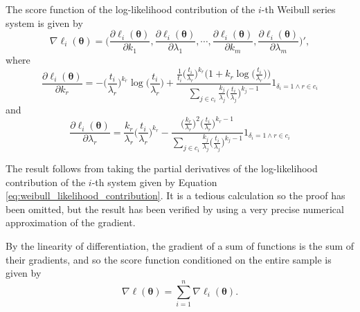 \documentclass[
]{article}
\begin{document}
\begin{theorem}
\label{thm:weibull_score}
The score function of the log-likelihood contribution of the $i$-th Weibull series
system is given by
\begin{equation}
\label{eq:weibull_score}
\nabla \ell_i(\boldsymbol{\theta}) = \biggl(
    \frac{\partial \ell_i(\boldsymbol{\theta})}{\partial k_1},
    \frac{\partial \ell_i(\boldsymbol{\theta})}{\partial \lambda_1},
    \cdots, 
    \frac{\partial \ell_i(\boldsymbol{\theta})}{\partial k_m},
    \frac{\partial \ell_i(\boldsymbol{\theta})}{\partial \lambda_m} \biggr)',
\end{equation}
where
\begin{equation}
\frac{\partial \ell_i(\boldsymbol{\theta})}{\partial k_r} = 
    -\biggl(\frac{t_i}{\lambda_r}\biggr)^{k_r}    
        \!\!\log\biggl(\frac{t_i}{\lambda_r}\biggr) +
        \frac{\frac{1}{t_i} \bigl(\frac{t_i}{\lambda_r}\bigr)^{k_r}
            \bigl(1+ k_r \log\bigl(\frac{t_i}{\lambda_r}\bigr)\bigr)}
            {\sum_{j \in c_i} \frac{k_j}{\lambda_j}\bigl(\frac{t_i}{\lambda_j}\bigr)^{k_j-1}}
        1_{\delta_i = 1 \land r \in c_i}
\end{equation}
and 
\begin{equation}
\frac{\partial \ell_i(\boldsymbol{\theta})}{\partial \lambda_r} = 
    \frac{k_r}{\lambda_r} \biggl(\frac{t_i}{\lambda_r}\biggr)^{k_r} -
    \frac{
        \bigl(\frac{k_r}{\lambda_r}\bigr)^2 \bigl(\frac{t_i}{\lambda_r}\bigr)^{k_r - 1}
    }
    {
        \sum_{j \in c_i} \frac{k_j}{\lambda_j}\bigl(\frac{t_i}{\lambda_j}\bigr)^{k_j-1}
    }
    1_{\delta_i = 1 \land r \in c_i}
\end{equation}
\end{theorem}

The result follows from taking the partial derivatives of the
log-likelihood contribution of the \(i\)-th system given by Equation
\eqref{eq:weibull_likelihood_contribution}. It is a tedious calculation
so the proof has been omitted, but the result has been verified by using
a very precise numerical approximation of the gradient.

By the linearity of differentiation, the gradient of a sum of functions
is the sum of their gradients, and so the score function conditioned on
the entire sample is given by \begin{equation}
\label{eq:weibull_series_score}
\nabla \ell(\boldsymbol{\theta}) = \sum_{i=1}^n \nabla \ell_i(\boldsymbol{\theta}).
\end{equation}
\end{document}

